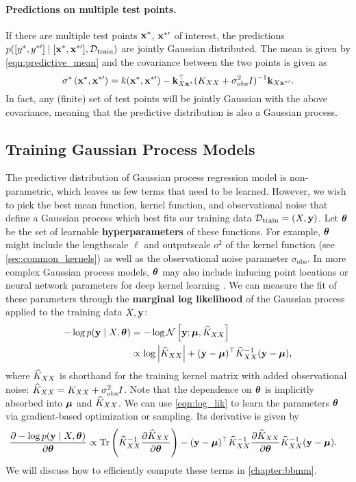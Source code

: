\paragraph{Predictions on multiple test points.}
If there are multiple test points $\mathbf{x}^*$, $\mathbf{x}^{*\prime}$ of interest, the predictions $p([y^*, y^{*\prime}] \mid [\mathbf{x}^*, \mathbf{x}^{*\prime}], \mathcal D_\text{train})$ are jointly Gaussian distributed.
The mean is given by \cref{eqn:predictive_mean} and the covariance between the two points is given as
\[ \sigma^* \left( \mathbf{x}^*, \mathbf{x}^{*\prime} \right) = k(\mathbf{x}^*, \mathbf{x}^{*\prime}) - \mathbf{k}_{X\mathbf{x}^*}^\top ( K_{XX} + \sigma_\text{obs}^2 I )^{-1} \mathbf{k}_{X\mathbf{x}^{*\prime}}. \]
In fact, any (finite) set of test points will be jointly Gaussian with the above covariance, meaning that the predictive distribution is also a Gaussian process.

\subsection{Training Gaussian Process Models}
\label{sec:gp_training}

The predictive distribution of Gaussian process regression model is non-parametric, which leaves us few terms that need to be learned.
However, we wish to pick the best mean function, kernel function, and observational noise that define a Gaussian process which best fits our training data $\mathcal D_\text{train} = (X, \mathbf{y})$.
Let $\boldsymbol{\theta}$ be the set of learnable {\bf hyperparameters} of these functions.
For example, $\boldsymbol{\theta}$ might include the lengthscale $\ell$ and outputscale $o^2$ of the kernel function (see \cref{sec:common_kernels}) as well as the observational noise parameter $\sigma_\text{obs}$.
In more complex Gaussian process models, $\boldsymbol{\theta}$ may also include inducing point locations \cite{titsias2009variational} or neural network parameters for deep kernel learning \cite{wilson2016deep}.
We can measure the fit of these parameters through the {\bf marginal log likelihood} of the Gaussian process applied to the training data $X, \mathbf{y}$:
%
\begin{align}
  -\log p( \by \mid \bX, \btheta)
  &= -\log \normaldist{ \by ; \bmu }{ \trainK }
  \nonumber{} \\
  &\propto \log \left \vert \trainK \right \vert + (\by - \bmu)^{\top} \trainK^{-1} (\by - \bmu),
  \label{eqn:log_lik}
\end{align}
%
where $\widehat{K}_{XX}$ is shorthand for the training kernel matrix with added observational noise: $\widehat{K}_{XX} = K_{XX} + \sigma_\text{obs}^2 I$.
Note that the dependence on $\boldsymbol{\theta}$ is implicitly absorbed into $\boldsymbol{\mu}$ and $\widehat{K}_{XX}$.
We can use \cref{eqn:log_lik} to learn the parameters $\boldsymbol{\theta}$ via gradient-based optimization or sampling.
Its derivative is given by
%
\begin{align}
  \frac{\partial - \log p( \by \mid \bX, \btheta )}{\partial \btheta} &\propto
   \tr{\trainK^{-1}\frac{\partial \trainK}{\partial \btheta}} -
	 (\by - \bmu)^{\top} \trainK^{-1}\frac{\partial \trainK}{\partial \btheta}\trainK^{-1} (\by - \bmu).
  \label{eqn:log_lik_deriv}
\end{align}
%
We will discuss how to efficiently compute these terms in \cref{chapter:bbmm}.

